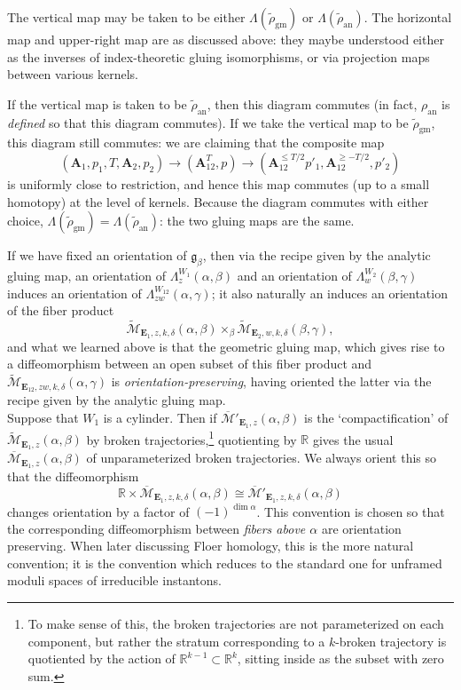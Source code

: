 \documentclass[10pt,a4paper]{amsart}
\theoremstyle{definition}
\theoremstyle{remark}
\numberwithin{figure}{qchap}
\begin{document}
The vertical map may be taken to be either $\Lambda(\widetilde{\rho}_{\text{gm}})$ or $\Lambda(\widetilde{\rho}_{\text{an}})$. The horizontal map and upper-right map are as discussed above: they maybe understood either as the inverses of index-theoretic gluing isomorphisms, or via projection maps between various kernels.

If the vertical map is taken to be $\widetilde{\rho}_{\text{an}}$, then this diagram commutes (in fact, $\rho_{\text{an}}$ is \textit{defined} so that this diagram commutes). If we take the vertical map to be $\widetilde{\rho}_{\text{gm}}$, this diagram still commutes: we are claiming that the composite map 
$$(\mathbf{A}_1, p_1, T, \mathbf{A}_2, p_2) \to (\mathbf{A}_{12}^T, p) \to (\mathbf{A}_{12}^{\leq T/2} p'_1, \mathbf{A}_{12}^{\geq -T/2}, p'_2)$$ 
is uniformly close to restriction, and hence this map commutes (up to a small homotopy) at the level of kernels. Because the diagram commutes with either choice, $\Lambda(\widetilde \rho_{\text{gm}}) = \Lambda(\widetilde \rho_{\text{an}})$: the two gluing maps are the same.

If we have fixed an orientation of $\mathfrak g_\beta$, then via the recipe given by the analytic gluing map, an orientation of $\Lambda_z^{W_1}(\alpha, \beta)$ and an orientation of $\Lambda_w^{W_2}(\beta, \gamma)$ induces an orientation of $\Lambda_{zw}^{W_{12}}(\alpha, \gamma)$; it also naturally an induces an orientation of the fiber product 
$$\widetilde{\mathcal M}_{\mathbf{E}_1, z, k, \delta}(\alpha, \beta) \times_\beta \widetilde{\mathcal M}_{\mathbf{E}_2, w, k, \delta}(\beta, \gamma),$$ 
and what we learned above is that the geometric gluing map, which gives rise to a diffeomorphism between an open subset of this fiber product and $\widetilde{\mathcal M}_{\mathbf{E}_{12}, zw, k, \delta}(\alpha, \gamma)$ is \emph{orientation-preserving}, having oriented the latter via the recipe given by the analytic gluing map.\\

Suppose that $W_1$ is a cylinder. Then if $\overline{\mathcal M}'_{\mathbf{E}_1, z}(\alpha, \beta)$ is the `compactification' of $\widetilde{\mathcal M}_{\mathbf{E}_1, z}(\alpha, \beta)$ by broken trajectories,\footnote{To make sense of this, the broken trajectories are not parameterized on each component, but rather the stratum corresponding to a $k$-broken trajectory is quotiented by the action of $\mathbb R^{k-1} \subset \mathbb R^k$, sitting inside as the subset with zero sum.} quotienting by $\mathbb R$ gives the usual $\overline{\mathcal M}_{\mathbf{E}_1, z}(\alpha, \beta)$ of unparameterized broken trajectories. We always orient this so that the diffeomorphism $$\mathbb R \times \overline{\mathcal M}_{\mathbf{E}_1, z, k,\delta}(\alpha, \beta) \cong \overline{\mathcal M}'_{\mathbf{E}_1, z, k,\delta}(\alpha, \beta)$$ changes orientation by a factor of $(-1)^{\dim \alpha}$. This convention is chosen so that the corresponding diffeomorphism between \emph{fibers above $\alpha$} are orientation preserving. When later discussing Floer homology, this is the more natural convention; it is the convention which reduces to the standard one for unframed moduli spaces of irreducible instantons.\\
\end{document}
